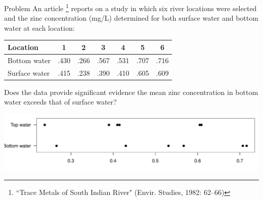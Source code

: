 \documentclass[t,handout]{beamer}
\begin{document}
    \begin{frame}{Problem}
    An article \footnote{``Trace Metals of South Indian River" (Envir.
    Studies, 1982: 62--66)} reports on a study in which six river locations were selected
    and the zinc concentration (mg/L) determined for both
    surface water and bottom water at each location:
    
    \begin{center}
    \begin{tabular}{l|cccccc}
    Location & 1 & 2 & 3 & 4 & 5 & 6 \\ \hline
    Bottom water &
    .430 & .266 & .567 & .531 & .707 & .716 \\ \hline
    Surface water &
    .415 & .238 & .390 & .410 & .605 & .609 \\ \hline
    \end{tabular}
    \end{center}
    
    \pause \begin{block}{}
    Does the data provide significant evidence the mean zinc concentration in bottom water exceeds that of surface water?
    \end{block}
    
    \pause 
    \vspace{-.6cm}
    \begin{center}
    \includegraphics[scale=.5]{ch9_dotplot2.pdf}
    \end{center}
    \end{frame}
    
\end{document}

